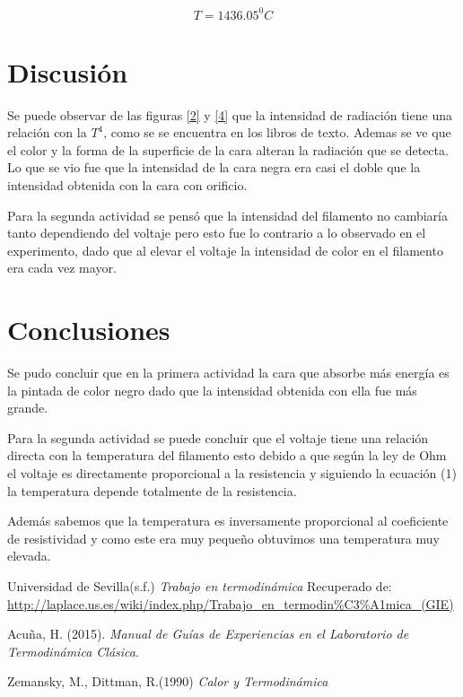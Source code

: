 \documentclass[12pt]{article}
\begin{document}
$$T= 1436.05 ^0C$$
\section{Discusión}
Se puede observar de las figuras \ref{2} y \ref{4} que la intensidad de radiación tiene una relación con la $T^4$, como se se encuentra en los libros de texto. Ademas se ve que el color y la forma de la superficie de la cara alteran la radiación que se detecta. Lo que se vio fue que la intensidad de la cara negra era casi el doble que la intensidad obtenida con la cara con orificio.

Para la segunda actividad se pensó que la intensidad del filamento no cambiaría tanto dependiendo del voltaje pero esto fue lo contrario a lo observado en el experimento, dado que al elevar el voltaje la intensidad de color en el filamento era cada vez mayor.
\section{Conclusiones}
Se pudo concluir que en la primera actividad la cara que absorbe más energía es la pintada de color negro dado que la intensidad obtenida con ella fue más grande.

Para la segunda actividad se puede concluir que el voltaje tiene una relación directa con la temperatura del filamento esto debido a que según la ley de Ohm el voltaje es directamente proporcional a la resistencia y siguiendo la ecuación (1) la temperatura depende totalmente de la resistencia.

Además sabemos que la temperatura es inversamente proporcional al coeficiente de resistividad y como este era muy pequeño obtuvimos una temperatura muy elevada.



\begin{thebibliography}{6}

Universidad de Sevilla(s.f.) \textit{Trabajo en termodinámica} Recuperado de:
\url{http://laplace.us.es/wiki/index.php/Trabajo_en_termodin\%C3\%A1mica_(GIE)}

Acuña, H. (2015). \textit{Manual de Guías de Experiencias en el Laboratorio de Termodinámica Clásica}.

Zemansky, M., Dittman, R.(1990) \textit{Calor y Termodinámica}


\end{thebibliography}
\end{document}
